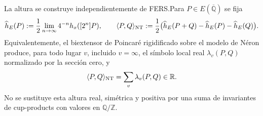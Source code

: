 \begin{proposition}
La altura se construye independientemente de FERS.\@ Para
$P\in E(\overline{\mathbb Q})$ se fija
\begin{equation}\label{eq:pdf2-bsd-altura-canonica-construida}
 \widehat h_E(P):=
 \frac12\lim_{n\to\infty}4^{-n}h_x([2^n]P),
 \qquad
 \langle P,Q\rangle_{\rm NT}:=
 \frac12\bigl(\widehat h_E(P+Q)-\widehat h_E(P)-\widehat h_E(Q)\bigr).
\end{equation}
Equivalentemente, el biextensor de Poincaré rigidificado sobre el modelo de
Néron produce, para todo lugar $v$, incluido $v=\infty$, el símbolo local
real $\lambda_v(P,Q)$ normalizado por la sección cero, y
\begin{equation}\label{eq:pdf2-bsd-altura-neron-local-global}
 \langle P,Q\rangle_{\rm NT}
 =\sum_v\lambda_v(P,Q)\in\mathbb R.
\end{equation}
No se sustituye esta altura real, simétrica y positiva por una suma de
invariantes de cup-products con valores en $\mathbb Q/\mathbb Z$.


\end{proposition}
